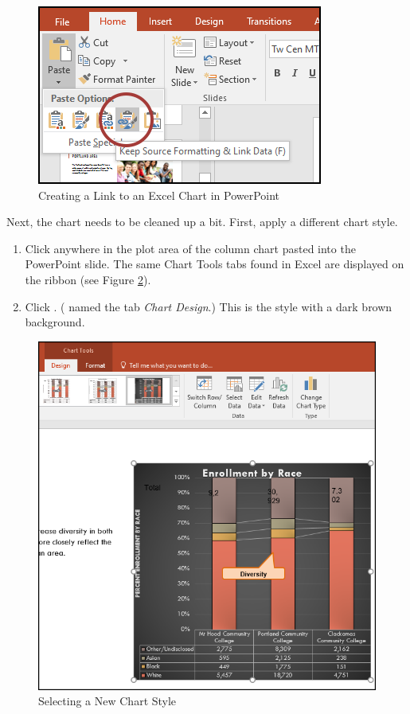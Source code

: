 \begin{figure}[H]
	\centering
	\includegraphics[width=\maxwidth{.75\linewidth}]{gfx/ch04_fig49}
	\caption{Creating a Link to an Excel Chart in PowerPoint}
	\label{04:fig49}
\end{figure}

Next, the chart needs to be cleaned up a bit. First, apply a different chart style.

\begin{enumbox}
	\begin{enumerate}
		\item Click anywhere in the plot area of the column chart pasted into the PowerPoint slide. The same Chart Tools tabs found in Excel are displayed on the ribbon (see Figure \ref{04:fig50}).
		\item Click . ( named the tab \textit{Chart Design}.) This is the style with a dark brown background.
	\end{enumerate}
\end{enumbox}
	
\begin{figure}[H]
	\centering
	\includegraphics[width=\maxwidth{.85\linewidth}]{gfx/ch04_fig50}
	\caption{Selecting a New Chart Style}
	\label{04:fig50}
\end{figure}

